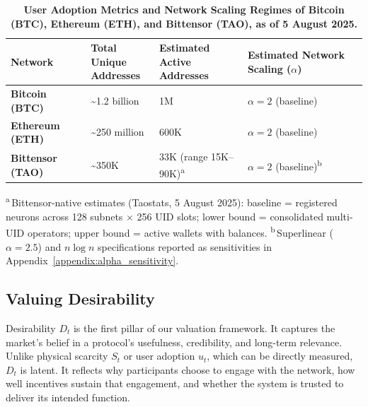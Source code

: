\documentclass[12pt]{article}
\begin{document}
\begin{table}[H]
\centering
\caption{\textbf{User Adoption Metrics and Network Scaling Regimes of Bitcoin (BTC), Ethereum (ETH), and Bittensor (TAO), as of 5 August 2025.}}
\label{tab:user_adoption}
\renewcommand{\arraystretch}{1.4}
\begin{tabular}{@{}>{\raggedright\arraybackslash}p{3.5cm} >{\raggedright\arraybackslash}p{4.5cm} >{\raggedright\arraybackslash}p{4.5cm} >{\raggedright\arraybackslash}p{3.5cm}@{}}
\toprule
\rowcolor{gray!15}
\textbf{Network} & \shortstack{\textbf{Total Unique} \\ \textbf{Addresses}} & \shortstack{\textbf{Estimated Active} \\ \textbf{Addresses}} & \shortstack{\textbf{Estimated Network} \\ \textbf{Scaling (\( \alpha \))}} \\
\midrule
\textbf{Bitcoin (BTC)} & \textasciitilde1.2 billion \citep{bitinfochartsBTC} & 1M \citep{glassnodeBTC} & \( \alpha = 2 \) (baseline) \\
\textbf{Ethereum (ETH)} & \textasciitilde250 million \citep{etherscan} & 600K \citep{glassnodeETH} & \( \alpha = 2 \) (baseline) \\
\textbf{Bittensor (TAO)} & \textasciitilde350K \citep{taostats_accounts} & 33K (range 15K--90K)\textsuperscript{a} & \( \alpha = 2 \) (baseline)\textsuperscript{b} \\
\bottomrule
\end{tabular}

\vspace{0.4em}
\footnotesize
\textsuperscript{a}\,Bittensor-native estimates (Taostats, 5 August 2025): baseline = registered neurons across 128 subnets \(\times\) 256 UID slots; lower bound = consolidated multi-UID operators; upper bound = active wallets with balances. \quad
\textsuperscript{b}\,Superlinear (\( \alpha = 2.5 \)) and \( n \log n \) specifications reported as sensitivities in Appendix~\ref{appendix:alpha_sensitivity}.
\end{table}





\subsection{Valuing Desirability}

Desirability \( D_t \) is the first pillar of our valuation framework. It captures the market’s belief in a protocol’s usefulness, credibility, and long-term relevance. Unlike physical scarcity \( S_t \) or user adoption \( u_t \), which can be directly measured, \( D_t \) is latent. It reflects why participants choose to engage with the network, how well incentives sustain that engagement, and whether the system is trusted to deliver its intended function.
\end{document}
